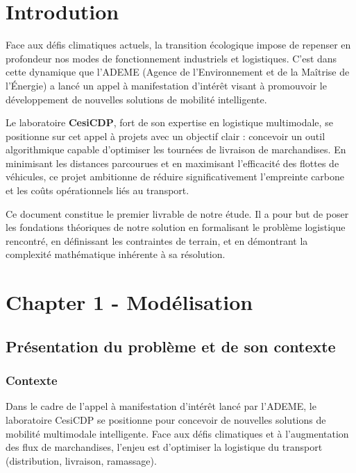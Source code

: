 \section*{Introdution}

Face aux défis climatiques actuels, la transition écologique impose de repenser en profondeur nos modes de fonctionnement industriels et logistiques. C'est dans cette dynamique que l'ADEME (Agence de l'Environnement et de la Maîtrise de l'Énergie) a lancé un appel à manifestation d'intérêt visant à promouvoir le développement de nouvelles solutions de mobilité intelligente. 

\noindent Le laboratoire \textbf{CesiCDP}, fort de son expertise en logistique multimodale, se positionne sur cet appel à projets avec un objectif clair : concevoir un outil algorithmique capable d'optimiser les tournées de livraison de marchandises. En minimisant les distances parcourues et en maximisant l'efficacité des flottes de véhicules, ce projet ambitionne de réduire significativement l'empreinte carbone et les coûts opérationnels liés au transport.

\noindent Ce document constitue le premier livrable de notre étude. Il a pour but de poser les fondations théoriques de notre solution en formalisant le problème logistique rencontré, en définissant les contraintes de terrain, et en démontrant la complexité mathématique inhérente à sa résolution.

\newpage

\section*{Chapter 1 - Modélisation}

\subsection*{Présentation du problème et de son contexte}
{}

\subsubsection*{Contexte}
{}

Dans le cadre de l'appel à manifestation d'intérêt lancé par l'ADEME, le laboratoire CesiCDP se positionne pour concevoir de nouvelles solutions de mobilité multimodale intelligente. Face aux défis climatiques et à l'augmentation des flux de marchandises, l'enjeu est d'optimiser la logistique du transport (distribution, livraison, ramassage).

